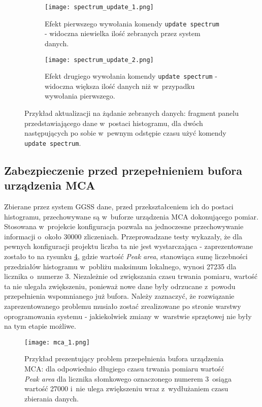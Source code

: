 \begin{figure}[H]
\centering

\begin{subfigure}{0.66\textwidth}
\centering
\texttt{[image: spectrum\_update\_1.png]}
\caption{Efekt pierwszego wywołania komendy \lstinline{update spectrum} - widoczna niewielka ilość zebranych przez system danych.}
\label{fig:spectrum_update_1}
\end{subfigure}

\vspace*{8pt}%

\begin{subfigure}{0.66\textwidth}
\centering
\texttt{[image: spectrum\_update\_2.png]}
\caption{Efekt drugiego wywołania komendy \lstinline{update spectrum} - widoczna większa ilość danych niż w~przypadku wywołania pierwszego.}
\label{fig:spectrum_update_2}
\end{subfigure}

\caption{Przykład aktualizacji na żądanie zebranych danych: fragment panelu przedstawiającego dane w~postaci histogramu, dla dwóch następujących po sobie w~pewnym odstępie czasu użyć komendy \lstinline{update spectrum}.}
\label{fig:spectrum_update}
\end{figure}

\clearpage
\subsection{Zabezpieczenie przed przepełnieniem bufora urządzenia MCA}
Zbierane przez system GGSS dane, przed przekształceniem ich do postaci histogramu, przechowywane są w~buforze urządzenia MCA dokonującego pomiar. Stosowana w~projekcie konfiguracja pozwala na jednoczesne przechowywanie informacji o~około 30000 zliczeniach. Przeprowadzane testy wykazały, że dla pewnych konfiguracji projektu liczba ta nie jest wystarczająca - zaprezentowane zostało to na rysunku \ref{fig:mca_1}, gdzie wartość \emph{Peak area}, stanowiąca sumę liczebności przedziałów histogramu w~pobliżu maksimum lokalnego, wynosi 27235 dla licznika o~numerze 3. Niezależnie od zwiększania czasu trwania pomiaru, wartość ta nie ulegała zwiększeniu, ponieważ nowe dane były odrzucane z~powodu przepełnienia wspomnianego już bufora. Należy zaznaczyć, że rozwiązanie zaprezentowanego problemu musiało zostać zrealizowane po stronie warstwy oprogramowania systemu - jakiekolwiek zmiany w~warstwie sprzętowej nie były na tym etapie możliwe.

\begin{figure}[H]
\centering
\texttt{[image: mca\_1.png]}
\caption{Przykład prezentujący problem przepełnienia bufora urządzenia MCA: dla odpowiednio długiego czasu trwania pomiaru wartość \emph{Peak area} dla licznika słomkowego oznaczonego numerem 3~osiąga wartość 27000 i~nie ulega zwiększeniu wraz z~wydłużaniem czasu zbierania danych.}
\label{fig:mca_1}
\end{figure}


